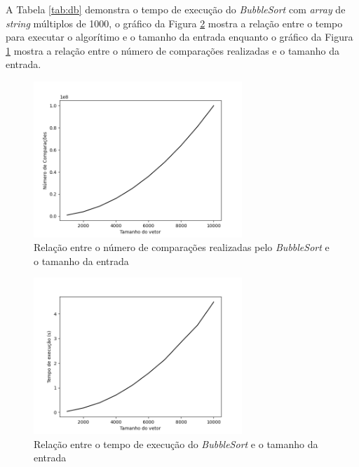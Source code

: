 \documentclass[12pt,a4paper,oneside]{article}
\begin{document}
\quad A Tabela \ref{tab:db} demonstra o tempo de execução do \textit{BubbleSort} com \textit{array} de \textit{string} múltiplos de 1000, o gráfico da Figura \ref{fig:tb} mostra a relação entre o tempo para executar o algorítimo e o tamanho da entrada enquanto o gráfico da Figura \ref{fig:nb} mostra a relação entre o número de comparações realizadas e o tamanho da entrada.

\begin{figure}[H]
\begin{center}
    \includegraphics[width=0.7\textwidth]{FigNB.png} 
\end{center}
\caption{Relação entre o número de comparações realizadas pelo \textit{BubbleSort} e o tamanho da entrada}
\label{fig:nb}
\end{figure}

\begin{figure}[H]
\begin{center}
    \includegraphics[width=0.7\textwidth]{FigTB.png} 
\end{center}
\caption{Relação entre o tempo de execução do \textit{BubbleSort} e o tamanho da entrada}
\label{fig:tb}
\end{figure}
\end{document}
